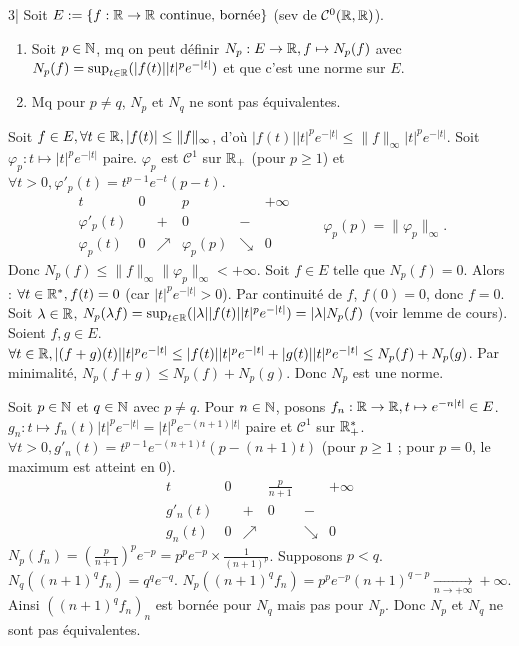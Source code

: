 
\begin{statementbox}
3| Soit $E := \{f : \mathbb R \to \mathbb R \text{ continue, bornée}\}$ (sev de $\mathcal{C}^0(\mathbb R, \mathbb R)$).
\begin{enumerate}[label=\alph*)]
  \item Soit $p \in \mathbb N$, mq on peut définir $N_p : E \to \mathbb R, f \mapsto N_p(f)$ avec $N_p(f) = \sup_{t \in \mathbb R} (|f(t)| |t|^p e^{-|t|})$ et que c'est une norme sur $E$.
  \item Mq pour $p \neq q$, $N_p$ et $N_q$ ne sont pas équivalentes.
\end{enumerate}
\end{statementbox}

\begin{solution}
Soit $f \in E, \forall t \in \mathbb R, |f(t)| \leq \|f\|_\infty$, d'où $|f(t)| |t|^p e^{-|t|} \leq \|f\|_\infty |t|^p e^{-|t|}$.
Soit $\varphi_p : t \mapsto |t|^p e^{-|t|}$ paire.
$\varphi_p$ est $\mathcal{C}^1$ sur $\mathbb R_+$ (pour $p \geq 1$) et $\forall t > 0, \varphi'_p(t) = t^{p-1} e^{-t} (p - t)$.
\[
\begin{array}{c|ccccc}
t & 0 & & p & & +\infty \\ \hline
\varphi'_p(t) & & + & 0 & - & \\ \hline
\varphi_p(t) & 0 & \nearrow & \varphi_p(p) & \searrow & 0
\end{array}
\qquad \varphi_p(p) = \|\varphi_p\|_\infty.
\]
Donc $N_p(f) \leq \|f\|_\infty \|\varphi_p\|_\infty < +\infty$.
Soit $f \in E$ telle que $N_p(f) = 0$. Alors : $\forall t \in \mathbb R^*, f(t) = 0$ (car $|t|^p e^{-|t|} > 0$). Par continuité de $f$, $f(0) = 0$, donc $f = 0$.
Soit $\lambda \in \mathbb R$, $N_p(\lambda f) = \sup_{t \in \mathbb R} (|\lambda| |f(t)| |t|^p e^{-|t|}) = |\lambda| N_p(f)$ (voir lemme de cours).
Soient $f, g \in E$. $\forall t \in \mathbb R, |(f + g)(t)| |t|^p e^{-|t|} \leq |f(t)| |t|^p e^{-|t|} + |g(t)| |t|^p e^{-|t|} \leq N_p(f) + N_p(g)$.
Par minimalité, $N_p(f + g) \leq N_p(f) + N_p(g)$.
Donc $N_p$ est une norme.

Soit $p \in \mathbb N$ et $q \in \mathbb N$ avec $p \neq q$.
Pour $n \in \mathbb N$, posons $f_n : \mathbb R \to \mathbb R, t \mapsto e^{-n|t|} \in E$.
$g_n : t \mapsto f_n(t) |t|^p e^{-|t|} = |t|^p e^{-(n+1)|t|}$ paire et $\mathcal{C}^1$ sur $\mathbb R_+^*$.
$\forall t > 0, g'_n(t) = t^{p-1} e^{-(n+1)t} (p - (n+1)t)$ (pour $p \geq 1$ ; pour $p = 0$, le maximum est atteint en $0$).
\[
\begin{array}{c|ccccc}
t & 0 & & \frac{p}{n+1} & & +\infty \\ \hline
g'_n(t) & & + & 0 & - & \\ \hline
g_n(t) & 0 & \nearrow & & \searrow & 0
\end{array}
\]
$N_p(f_n) = \left(\frac{p}{n+1}\right)^p e^{-p} = p^p e^{-p} \times \frac{1}{(n+1)^p}$.
Supposons $p < q$.
$N_q((n+1)^q f_n) = q^q e^{-q}$.
$N_p((n+1)^q f_n) = p^p e^{-p} (n+1)^{q-p} \xrightarrow[n \to +\infty]{} +\infty$.
Ainsi $((n+1)^q f_n)_n$ est bornée pour $N_q$ mais pas pour $N_p$.
Donc $N_p$ et $N_q$ ne sont pas équivalentes.
\end{solution}

